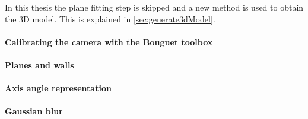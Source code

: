 In this thesis the plane fitting step is skipped and a new method is
used to obtain the 3D model. This is explained in \ref{sec:generate3dModel}.

% 
% 




\paragraph{Calibrating the camera with the Bouguet toolbox}
%  
%  
%  
%  
%  
\paragraph{Planes and walls}
%  
\paragraph{Axis angle representation}
%  
\paragraph{Gaussian blur}
